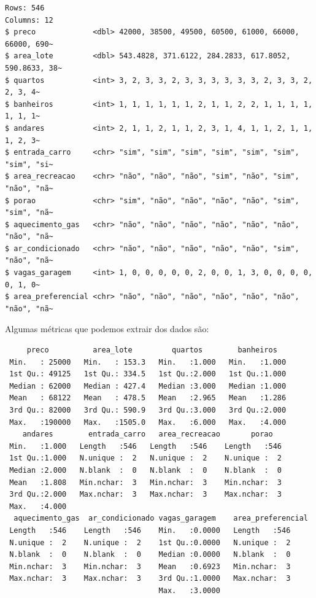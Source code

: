 \documentclass[
  letterpaper,
  DIV=11,
  numbers=noendperiod]{scrartcl}
\begin{document}
\begin{verbatim}
Rows: 546
Columns: 12
$ preco             <dbl> 42000, 38500, 49500, 60500, 61000, 66000, 66000, 690~
$ area_lote         <dbl> 543.4828, 371.6122, 284.2833, 617.8052, 590.8633, 38~
$ quartos           <int> 3, 2, 3, 3, 2, 3, 3, 3, 3, 3, 3, 2, 3, 3, 2, 2, 3, 4~
$ banheiros         <int> 1, 1, 1, 1, 1, 1, 2, 1, 1, 2, 2, 1, 1, 1, 1, 1, 1, 1~
$ andares           <int> 2, 1, 1, 2, 1, 1, 2, 3, 1, 4, 1, 1, 2, 1, 1, 1, 2, 3~
$ entrada_carro     <chr> "sim", "sim", "sim", "sim", "sim", "sim", "sim", "si~
$ area_recreacao    <chr> "não", "não", "não", "sim", "não", "sim", "não", "nã~
$ porao             <chr> "sim", "não", "não", "não", "não", "sim", "sim", "nã~
$ aquecimento_gas   <chr> "não", "não", "não", "não", "não", "não", "não", "nã~
$ ar_condicionado   <chr> "não", "não", "não", "não", "não", "sim", "não", "nã~
$ vagas_garagem     <int> 1, 0, 0, 0, 0, 0, 2, 0, 0, 1, 3, 0, 0, 0, 0, 0, 1, 0~
$ area_preferencial <chr> "não", "não", "não", "não", "não", "não", "não", "nã~
\end{verbatim}

Algumas métricas que podemos extrair dos dados são:

\begin{verbatim}
     preco          area_lote         quartos        banheiros    
 Min.   : 25000   Min.   : 153.3   Min.   :1.000   Min.   :1.000  
 1st Qu.: 49125   1st Qu.: 334.5   1st Qu.:2.000   1st Qu.:1.000  
 Median : 62000   Median : 427.4   Median :3.000   Median :1.000  
 Mean   : 68122   Mean   : 478.5   Mean   :2.965   Mean   :1.286  
 3rd Qu.: 82000   3rd Qu.: 590.9   3rd Qu.:3.000   3rd Qu.:2.000  
 Max.   :190000   Max.   :1505.0   Max.   :6.000   Max.   :4.000  
    andares        entrada_carro   area_recreacao       porao    
 Min.   :1.000   Length   :546   Length   :546    Length   :546  
 1st Qu.:1.000   N.unique :  2   N.unique :  2    N.unique :  2  
 Median :2.000   N.blank  :  0   N.blank  :  0    N.blank  :  0  
 Mean   :1.808   Min.nchar:  3   Min.nchar:  3    Min.nchar:  3  
 3rd Qu.:2.000   Max.nchar:  3   Max.nchar:  3    Max.nchar:  3  
 Max.   :4.000                                                   
  aquecimento_gas  ar_condicionado vagas_garagem    area_preferencial
 Length   :546    Length   :546    Min.   :0.0000   Length   :546    
 N.unique :  2    N.unique :  2    1st Qu.:0.0000   N.unique :  2    
 N.blank  :  0    N.blank  :  0    Median :0.0000   N.blank  :  0    
 Min.nchar:  3    Min.nchar:  3    Mean   :0.6923   Min.nchar:  3    
 Max.nchar:  3    Max.nchar:  3    3rd Qu.:1.0000   Max.nchar:  3    
                                   Max.   :3.0000                    
\end{verbatim}
\end{document}
